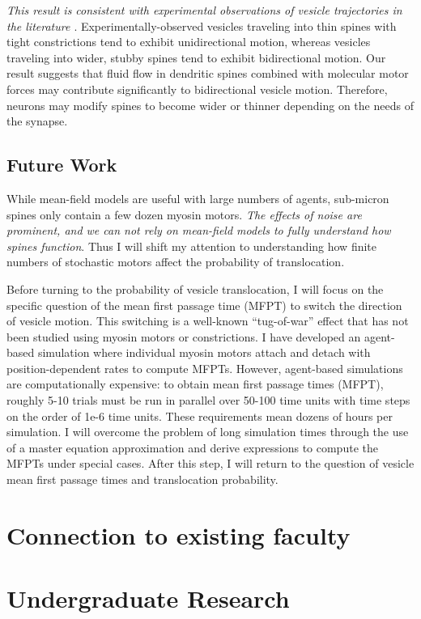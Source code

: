 \documentclass[a4paper,11pt]{article}
\begin{document}
	\textit{This result is consistent with experimental observations of vesicle trajectories in the literature \cite{park2020dynamics}}. Experimentally-observed vesicles traveling into thin spines with tight constrictions tend to exhibit unidirectional motion, whereas vesicles traveling into wider, stubby spines tend to exhibit bidirectional motion. Our result suggests that fluid flow in dendritic spines combined with molecular motor forces may contribute significantly to bidirectional vesicle motion. Therefore, neurons may modify spines to become wider or thinner depending on the needs of the synapse.
	
	\subsection{Future Work}
	While mean-field models are useful with large numbers of agents, sub-micron spines only contain a few dozen myosin motors. \textit{The effects of noise are prominent, and we can not rely on mean-field models to fully understand how spines function}. Thus I will shift my attention to understanding how finite numbers of stochastic motors affect the probability of translocation.
	
	Before turning to the probability of vesicle translocation, I will focus on the specific question of the mean first passage time (MFPT) to switch the direction of vesicle motion. This switching is a well-known ``tug-of-war'' effect \cite{julicher1995cooperative} that has not been studied using myosin motors or constrictions. I have developed an agent-based simulation where individual myosin motors attach and detach with position-dependent rates to compute MFPTs. However, agent-based simulations are computationally expensive: to obtain mean first passage times (MFPT), roughly 5-10 trials must be run in parallel over 50-100 time units with time steps on the order of 1e-6 time units. These requirements mean dozens of hours per simulation. I will overcome the problem of long simulation times through the use of a master equation approximation and derive expressions to compute the MFPTs under special cases. After this step, I will return to the question of vesicle mean first passage times and translocation probability.
	
	
	\section{Connection to existing faculty}\label{sec:fac}
	
	
	\section{Undergraduate Research}\label{sec:undergrad}
	
\end{document}
